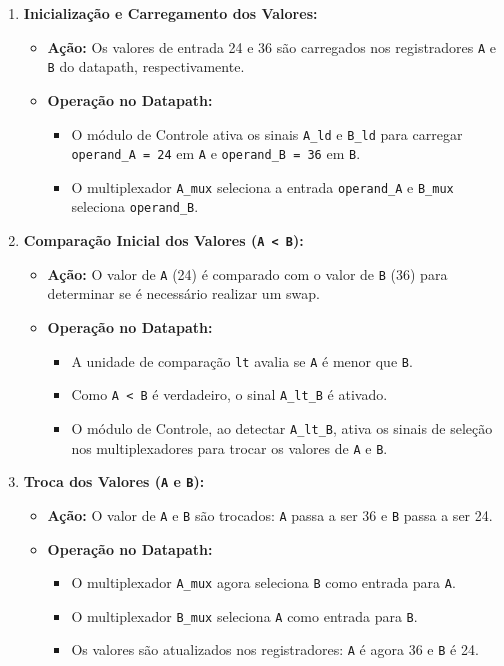 \documentclass[a4paper,11pt]{article} %
\begin{document}
\begin{enumerate}
    \item \textbf{Inicialização e Carregamento dos Valores:}
    \begin{itemize}
        \item \textbf{Ação:} Os valores de entrada 24 e 36 são carregados nos registradores \texttt{A} e \texttt{B} do datapath, respectivamente.
        \item \textbf{Operação no Datapath:} 
        \begin{itemize}
            \item O módulo de Controle ativa os sinais \texttt{A\_ld} e \texttt{B\_ld} para carregar \texttt{operand\_A = 24} em \texttt{A} e \texttt{operand\_B = 36} em \texttt{B}.
            \item O multiplexador \texttt{A\_mux} seleciona a entrada \texttt{operand\_A} e \texttt{B\_mux} seleciona \texttt{operand\_B}.
        \end{itemize}
    \end{itemize}

    \item \textbf{Comparação Inicial dos Valores (\texttt{A < B}):}
    \begin{itemize}
        \item \textbf{Ação:} O valor de \texttt{A} (24) é comparado com o valor de \texttt{B} (36) para determinar se é necessário realizar um swap.
        \item \textbf{Operação no Datapath:} 
        \begin{itemize}
            \item A unidade de comparação \texttt{lt} avalia se \texttt{A} é menor que \texttt{B}.
            \item Como \texttt{A < B} é verdadeiro, o sinal \texttt{A\_lt\_B} é ativado.
            \item O módulo de Controle, ao detectar \texttt{A\_lt\_B}, ativa os sinais de seleção nos multiplexadores para trocar os valores de \texttt{A} e \texttt{B}.
        \end{itemize}
    \end{itemize}

    \item \textbf{Troca dos Valores (\texttt{A} e \texttt{B}):}
    \begin{itemize}
        \item \textbf{Ação:} O valor de \texttt{A} e \texttt{B} são trocados: \texttt{A} passa a ser 36 e \texttt{B} passa a ser 24.
        \item \textbf{Operação no Datapath:} 
        \begin{itemize}
            \item O multiplexador \texttt{A\_mux} agora seleciona \texttt{B} como entrada para \texttt{A}.
            \item O multiplexador \texttt{B\_mux} seleciona \texttt{A} como entrada para \texttt{B}.
            \item Os valores são atualizados nos registradores: \texttt{A} é agora 36 e \texttt{B} é 24.
        \end{itemize}
    \end{itemize}


\end{enumerate}
\end{document}
